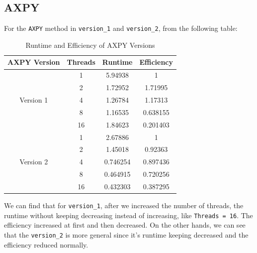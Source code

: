\documentclass[11pt]{article}
\begin{document}
\subsection{AXPY}
For the \verb|AXPY| method in \verb|version_1| and \verb|version_2|, from the following table:
\begin{table}[H]
\centering
\begin{tabular}{|c|c|c|c|}
\hline
\textbf{AXPY Version} & \textbf{Threads} & \textbf{Runtime} & \textbf{Efficiency} \\ \hline
\multirow{5}{*}{Version 1} 
& 1  & 5.94938  & 1        \\ \cline{2-4}
& 2  & 1.72952  & 1.71995  \\ \cline{2-4}
& 4  & 1.26784  & 1.17313  \\ \cline{2-4}
& 8  & 1.16535  & 0.638155 \\ \cline{2-4}
& 16 & 1.84623  & 0.201403 \\ \hline
\multirow{5}{*}{Version 2} 
& 1  & 2.67886  & 1        \\ \cline{2-4}
& 2  & 1.45018  & 0.92363  \\ \cline{2-4}
& 4  & 0.746254 & 0.897436 \\ \cline{2-4}
& 8  & 0.464915 & 0.720256 \\ \cline{2-4}
& 16 & 0.432303 & 0.387295 \\ \hline
\end{tabular}
\caption{Runtime and Efficiency of AXPY Versions}
\label{tab:AXPY}
\end{table}
We can find that for \verb|version_1|, after we increased the number of threads, the runtime without keeping decreasing instead of increasing, like \verb|Threads = 16|. The efficiency increased at first and then decreased. On the other hands, we can see that the \verb|version_2| is more general since it's runtime keeping decreased and the efficiency reduced normally. 
\end{document}
